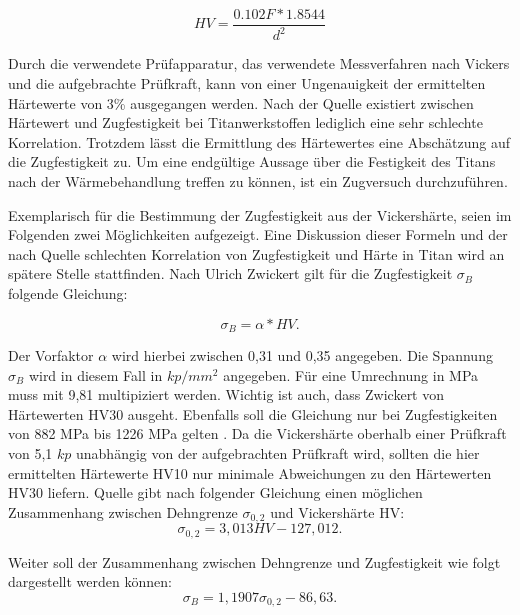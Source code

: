 \documentclass[a4paper, 11pt]{tubsreprt}
\begin{document}
\begin{equation}
HV = \frac{ 0.102 F * 1.8544 }{ d^{ 2 } }
\label{Vickershärte formel}
\end{equation}


Durch die verwendete Prüfapparatur, das verwendete Messverfahren nach Vickers und die aufgebrachte Prüfkraft, kann von einer Ungenauigkeit der ermittelten Härtewerte von 3\% ausgegangen werden.
Nach der Quelle \cite{Donachie2001} existiert zwischen Härtewert und Zugfestigkeit bei Titanwerkstoffen lediglich eine sehr schlechte Korrelation. Trotzdem lässt die Ermittlung des Härtewertes eine Abschätzung auf die Zugfestigkeit zu. Um eine endgültige Aussage über die Festigkeit des Titans nach der Wärmebehandlung treffen zu können, ist ein Zugversuch durchzuführen.


Exemplarisch für die Bestimmung der Zugfestigkeit aus der Vickershärte, seien im Folgenden zwei Möglichkeiten aufgezeigt. Eine Diskussion dieser Formeln und der nach Quelle \cite{Donachie2001} schlechten Korrelation von Zugfestigkeit und Härte in Titan wird an spätere Stelle stattfinden.
Nach Ulrich Zwickert gilt für die Zugfestigkeit  $\sigma_{B}$  folgende Gleichung:

\begin{equation}
\sigma_{B}=\alpha*HV.
\label{Zugfestigkeit}
\end{equation}

Der Vorfaktor $\alpha$ wird hierbei zwischen 0,31 und 0,35 angegeben. Die Spannung $\sigma_{B}$ wird in diesem Fall in $kp/mm^{2}$ angegeben. Für eine Umrechnung in MPa muss mit 9,81 multipiziert werden. Wichtig ist auch, dass Zwickert von Härtewerten HV30 ausgeht. Ebenfalls soll die Gleichung nur bei Zugfestigkeiten von 882 MPa bis 1226 MPa gelten \cite{Zwicker1974}. Da die Vickershärte oberhalb einer Prüfkraft von 5,1 $kp$ unabhängig von der aufgebrachten Prüfkraft wird, sollten die hier ermittelten Härtewerte HV10 nur minimale Abweichungen zu den Härtewerten HV30 liefern. 
Quelle \cite{Shi2013} gibt nach folgender Gleichung einen möglichen Zusammenhang zwischen Dehngrenze $\sigma_{0,2}$ und Vickershärte HV:
\begin{equation}
\sigma_{0,2} = 3,013 HV - 127,012.
\label{Formel zusammenhang dehngrenze vickershärte}
\end{equation}

Weiter soll der Zusammenhang zwischen Dehngrenze und Zugfestigkeit wie folgt dargestellt werden können: 
\begin{equation}
\sigma_{B} = 1,1907\sigma_{0,2} - 86,63.
\label{Formel zusammenhang dehngrenze und Zugfestigkeit}
\end{equation}
\end{document}
